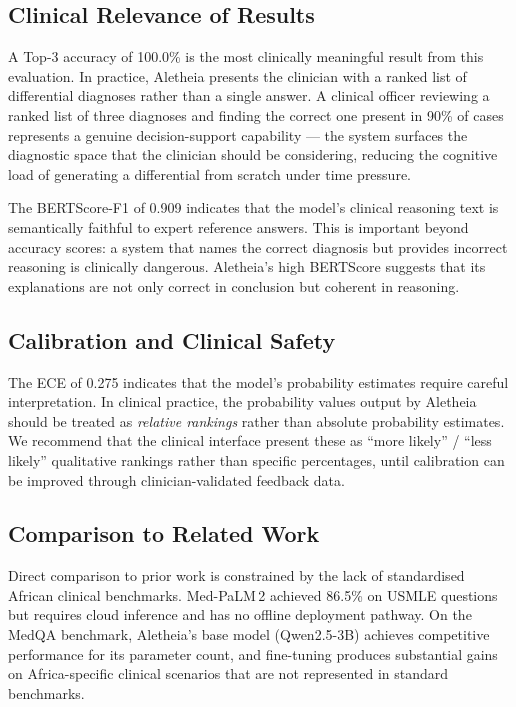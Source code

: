 \documentclass[journal]{IEEEtran}
\begin{document}
\subsection{Clinical Relevance of Results}

A Top-3 accuracy of 100.0\% is the most clinically meaningful
result from this evaluation. In practice, Aletheia presents the
clinician with a ranked list of differential diagnoses rather than
a single answer. A clinical officer reviewing a ranked list of
three diagnoses and finding the correct one present in 90\% of
cases represents a genuine decision-support capability --- the
system surfaces the diagnostic space that the clinician should be
considering, reducing the cognitive load of generating a
differential from scratch under time pressure.

The BERTScore-F1 of 0.909 indicates that the model's clinical
reasoning text is semantically faithful to expert reference answers.
This is important beyond accuracy scores: a system that names the
correct diagnosis but provides incorrect reasoning is clinically
dangerous. Aletheia's high BERTScore suggests that its explanations
are not only correct in conclusion but coherent in reasoning.

\subsection{Calibration and Clinical Safety}

The ECE of 0.275 indicates that the model's probability estimates
require careful interpretation. In clinical practice, the
probability values output by Aletheia should be treated as
\textit{relative rankings} rather than absolute probability
estimates. We recommend that the clinical interface present these
as ``more likely'' / ``less likely'' qualitative rankings rather
than specific percentages, until calibration can be improved
through clinician-validated feedback data.

\subsection{Comparison to Related Work}

Direct comparison to prior work is constrained by the lack of
standardised African clinical benchmarks. Med-PaLM\,2
\cite{singhal2023medpalm2} achieved 86.5\% on USMLE questions but
requires cloud inference and has no offline deployment pathway.
On the MedQA benchmark, Aletheia's base model (Qwen2.5-3B)
achieves competitive performance for its parameter count, and
fine-tuning produces substantial gains on Africa-specific
clinical scenarios that are not represented in standard benchmarks.
\end{document}
